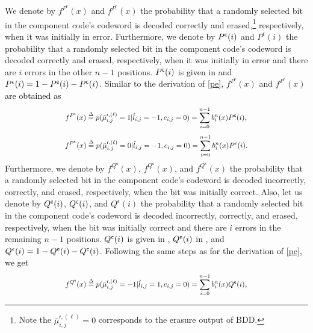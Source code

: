 \documentclass[journal]{IEEEtran}
\newcommand{\mep}{{x}}
\newcommand{\row}{\mathsf{r}}
\newcommand{\Pue}{P^{\mathsf{e}}}
\newcommand{\Que}{Q^{\mathsf{e}}}
\newcommand{\Puc}{P^{\mathsf{c}}}
\newcommand{\Quc}{Q^{\mathsf{c}}}
\newcommand{\Puep}{P^{\mathsf{\epsilon}}}
\newcommand{\Quep}{Q^{\mathsf{\epsilon}}}
\newcommand{\AG}{\textcolor{black}}
\let\originalleft\left
\let\originalright\right
\renewcommand{\left}{\mathopen{}\mathclose\bgroup\originalleft}
\renewcommand{\right}{\aftergroup\egroup\originalright}
\newcommand\scalemath[2]{\scalebox{#1}{\mbox{\ensuremath{\displaystyle #2}}}}   %
\begin{document}
We denote by $f^{\Puc}(\mep)$ and $f^{\Puep}(\mep)$ the probability that a randomly selected bit in the component code's codeword is decoded correctly and erased,\footnote{Note the $\bar \mu _{i,j}^{\row,(\ell )}=0$ corresponds to the erasure output of BDD.} respectively, when it was initially in error. Furthermore, we denote by $\Puc\left( i \right)$ and $P^\epsilon(i)$ the probability that a randomly selected bit in the
component code's codeword is decoded correctly and erased, respectively, when it was initially in error and there are $i$  errors in the other $n-1$ positions. $\Puc\left( i \right)$ is \AG{given} in \cite[Eq. (9)]{sheikhTCOM19} and $P^\epsilon(i)=1-\Pue\left( i \right)-\Puc\left( i \right)$. Similar to the derivation of \eqref{pe},  $f^{\Puc}(\mep)$ and $f^{\Puep}(\mep)$ \AG{are obtained as}
\begin{align}\label{pc} 
\scalemath{0.86}{ f^{\Puc}(\mep) \buildrel \Delta \over  =  p(\bar \mu _{i,j}^{\row,(\ell )}=1|{\hat l_{i,j}}=-1, c_{i,j}=0)   =  \sum\limits_{i = 0}^{n - 1}  b^{n}_i(x) {\Puc\left( i \right)}},
\end{align} 
\begin{align}\label{p_ep} 
\scalemath{0.86}{f^{\Puep}(\mep) \buildrel \Delta \over  =  p(\bar \mu _{i,j}^{\row,(\ell )}=0|{\hat l_{i,j}}=-1,c_{i,j}=0)  =  \sum\limits_{i = 0}^{n - 1}  b^{n}_i(x)  {\Puep\left( i \right)}}.
\end{align}
Furthermore, we denote by $f^{\Que}(\mep)$, $f^{\Quc}(\mep)$, and $f^{\Quep}(\mep)$ 
the probability that a randomly selected bit in the component code's codeword is decoded incorrectly, correctly, and erased, respectively, when the bit was initially correct. Also, let us denote by $\Que\left( i \right)$, $\Quc\left( i \right)$, and $Q^\epsilon(i)$ 
the probability that a randomly selected bit in the component code's codeword is decoded incorrectly, correctly, and erased, respectively, when the bit was initially correct and there are $i$ errors in the remaining $n-1$ positions. $\Quc\left( i \right)$ is \AG{given in \cite[Eq. (6)]{sheikhTCOM19}, $\Que\left( i \right)$   in \cite[Eq. (10)]{sheikhTCOM19},} and $\Quep\left( i \right)=1-\Que\left( i \right)-\Quc\left( i \right)$. Following the same steps \AG{as for the  derivation of \eqref{pe}, we get}
\begin{align}\label{qe} 
\scalemath{0.86}{f^{\Que}(\mep) \buildrel \Delta \over  =  p(\bar \mu _{i,j}^{\row,(\ell )}=-1|{\hat l_{i,j}}=1,c_{i,j}=0)   =  \sum\limits_{i = 0}^{n - 1}   b^{n}_i(x) {\Que\left( i \right)}},
\end{align}
\end{document}

